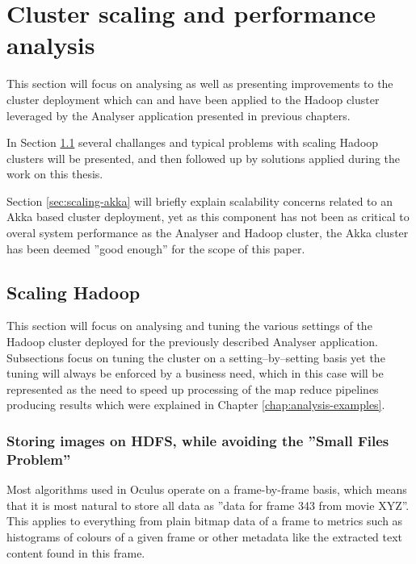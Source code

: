 \chapter{Cluster scaling and performance analysis}
\label{chap:perf-scalability}

This section will focus on analysing as well as presenting improvements to the cluster deployment which can and have been applied to the Hadoop cluster leveraged by the Analyser application presented in previous chapters.

In Section \ref{sec:scaling-hadoop} several challanges and typical problems with scaling Hadoop clusters will be presented, and then followed up by solutions applied during the work on this thesis.

Section \ref{sec:scaling-akka} will briefly explain scalability concerns related to an Akka based cluster deployment, yet as this component has not been as critical to overal system performance as the Analyser and Hadoop cluster, the Akka cluster has been deemed ''good enough'' for the scope of this paper.


\section{Scaling Hadoop}
\label{sec:scaling-hadoop}
This section will focus on analysing and tuning the various settings of the Hadoop cluster deployed for the previously described Analyser application. Subsections focus on tuning the cluster on a setting--by--setting basis yet the tuning will always be enforced by a business need, which in this case will be represented as the need to speed up processing of the map reduce pipelines producing results which were explained in Chapter \ref{chap:analysis-examples}.

\subsection{Storing images on HDFS, while avoiding the ''Small Files Problem''}
\label{sec:sequence-files}
Most algorithms used in Oculus operate on a frame-by-frame basis, which means that it is most natural to store all data as ''data for frame 343 from movie XYZ''. This applies to everything from plain bitmap data of a frame to metrics such as histograms of colours of a given frame or other metadata like the extracted text content found in this frame.

